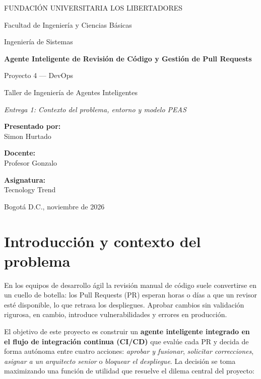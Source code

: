 \documentclass[11pt,a4paper]{article}
\begin{document}
\sloppy

\begin{titlepage}
\centering
{\large FUNDACIÓN UNIVERSITARIA LOS LIBERTADORES\par}
{\large Facultad de Ingeniería y Ciencias Básicas\par}
{\large Ingeniería de Sistemas\par}
\vspace{3cm}
{\Huge\bfseries Agente Inteligente de Revisión de Código y Gestión de Pull Requests\par}
\vspace{0.6cm}
{\Large Proyecto 4 --- DevOps\par}
\vspace{0.4cm}
{\large Taller de Ingeniería de Agentes Inteligentes\par}
\vspace{0.3cm}
{\large\itshape Entrega 1: Contexto del problema, entorno y modelo PEAS\par}
\vspace{3cm}
{\large\textbf{Presentado por:}\\ Simon Hurtado\par}
\vspace{0.8cm}
{\large\textbf{Docente:}\\ Profesor Gonzalo\par}
\vspace{0.8cm}
{\large\textbf{Asignatura:}\\ Tecnology Trend\par}
\vfill
{\large Bogotá D.C., noviembre de 2026\par}
\end{titlepage}

\tableofcontents
\newpage

\section{Introducción y contexto del problema}

En los equipos de desarrollo ágil la revisión manual de código suele convertirse en un cuello de
botella: los Pull Requests (PR) esperan horas o días a que un revisor esté disponible, lo que retrasa
los despliegues. Aprobar cambios sin validación rigurosa, en cambio, introduce vulnerabilidades y
errores en producción.

El objetivo de este proyecto es construir un \textbf{agente inteligente integrado en el flujo de
integración continua (CI/CD)} que evalúe cada PR y decida de forma autónoma entre cuatro acciones:
\textit{aprobar y fusionar}, \textit{solicitar correcciones}, \textit{asignar a un arquitecto senior}
o \textit{bloquear el despliegue}. La decisión se toma maximizando una función de utilidad que
resuelve el dilema central del proyecto:
\end{document}

